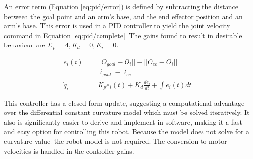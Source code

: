 An error term (Equation \eqref{eq:pid/error}) is defined by subtracting the distance between the goal point and an arm's base, and the end effector position and an arm's base. This error is used in a PID controller to yield the joint velocity command in Equation \eqref{eq:pid/complete}. The gains found to result in desirable behaviour are $K_p = 4, K_d = 0, K_i = 0$. 

\begin{align}
    e_i(t) &= ||O_{goal} - O_i|| - ||O_{ee} - O_i|| \label{eq:pid/error}\\
        &= \ell_{goal} - \ell_{ee} \nonumber\\
    \dot q_i &= K_pe_i(t) + K_d \frac{de_i}{dt} + \int e_i(t)dt\label{eq:pid/complete}
\end{align}

This controller has a closed form update, suggesting a computational advantage over the differential constant curvature model which must be solved iteratively. It also is significantly easier to derive and implement in software, making it a fast and easy option for controlling this robot. Because the model does not solve for a curvature value, the robot model is not required. The conversion to motor velocities is handled in the controller gains. 